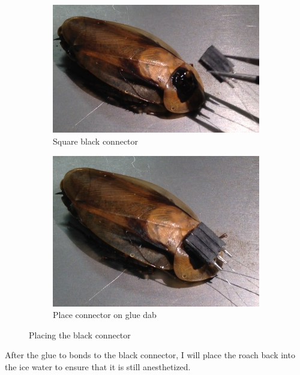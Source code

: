 \begin{figure}[ht!]
\centering
    \begin{subfigure}{.4\textwidth}
    \centering
    \includegraphics[scale=0.3]{Surgery Photos/connector1.JPG}
    \caption{Square black connector}
    \label{fig:connector1}
    \end{subfigure}
    \begin{subfigure}{.4\textwidth}
    \centering
    \includegraphics[scale=0.3]{Surgery Photos/connector2.JPG}
    \caption{Place connector on glue dab}
    \label{fig:connector2}
    \end{subfigure}
\caption{Placing the black connector}
\label{fig:connector}
\end{figure}
After the glue to bonds to the black connector, I will place the roach back into the ice water to ensure that it is still anesthetized.

